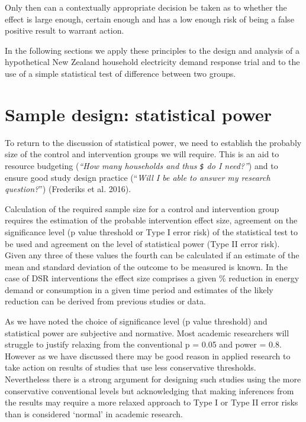 \documentclass[]{article}
\theoremstyle{definition}
\theoremstyle{definition}
\theoremstyle{definition}
\theoremstyle{remark}
\begin{document}
Only then can a contextually appropriate decision be taken as to whether
the effect is large enough, certain enough and has a low enough risk of
being a false positive result to warrant action.

In the following sections we apply these principles to the design and
analysis of a hypothetical New Zealand household electricity demand
response trial and to the use of a simple statistical test of difference
between two groups.

\section{Sample design: statistical
power}\label{sample-design-statistical-power}

To return to the discussion of statistical power, we need to establish
the probably size of the control and intervention groups we will
require. This is an aid to resource budgeting (\emph{``How many
households and thus \texttt{\$} do I need?''}) and to ensure good study
design practice (``\emph{Will I be able to answer my research
question?}'') (Frederiks et al. 2016).

Calculation of the required sample size for a control and intervention
group requires the estimation of the probable intervention effect size,
agreement on the significance level (p value threshold or Type I error
risk) of the statistical test to be used and agreement on the level of
statistical power (Type II error risk). Given any three of these values
the fourth can be calculated if an estimate of the mean and standard
deviation of the outcome to be measured is known. In the case of DSR
interventions the effect size comprises a given \% reduction in energy
demand or consumption in a given time period and estimates of the likely
reduction can be derived from previous studies or data.

As we have noted the choice of significance level (p value threshold)
and statistical power are subjective and normative. Most academic
researchers will struggle to justify relaxing from the conventional p =
0.05 and power = 0.8. However as we have discussed there may be good
reason in applied research to take action on results of studies that use
less conservative thresholds. Nevertheless there is a strong argument
for designing such studies using the more conservative conventional
levels but acknowledging that making inferences from the results may
require a more relaxed approach to Type I or Type II error risks than is
considered `normal' in academic research.
\end{document}
